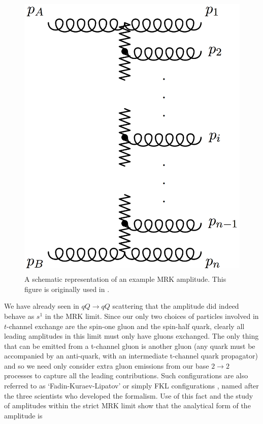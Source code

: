 \begin{figure}[t]
\centering
\includegraphics[scale=0.3]{Images/MRK_diagram.png} 
\caption{A schematic representation of an example MRK amplitude. This figure is originally used in \cite{Andersen2009a}.}
\label{fig:mrk}
\end{figure}

We have already seen in $qQ \to qQ$ scattering that the amplitude did indeed behave as $s^1$ in the MRK limit. Since our only two choices of particles involved in $t$-channel exchange are the spin-one gluon and the spin-half quark, clearly all leading amplitudes in this limit must only have gluons exchanged. The only thing that can be emitted from a t-channel gluon is another gluon (any quark must be accompanied by an anti-quark, with an intermediate t-channel quark propagator) and so we need only consider extra gluon emissions from our base $2 \to 2$ processes to capture all the leading contributions. Such configurations are also referred to as `Fadin-Kuraev-Lipatov' or simply FKL configurations , named after the three scientists who developed the formalism. Use of this fact and the study of amplitudes within the strict MRK limit \cite{DelDuca1995, Andersen2009a} show that the analytical form of the amplitude is

